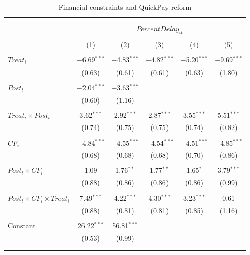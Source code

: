 \documentclass[
]{article}
\begin{document}
\begin{table}[H] \centering 
  \caption{Financial constraints and QuickPay reform} 
  \label{} 
\small 
\begin{tabular}{@{\extracolsep{-2pt}}lccccc} 
\\[-1.8ex]\hline 
\hline \\[-1.8ex] 
\\[-1.8ex] & \multicolumn{5}{c}{$PercentDelay_{it}$  } \\ 
\\[-1.8ex] & (1) & (2) & (3) & (4) & (5)\\ 
\hline \\[-1.8ex] 
 $Treat_i$ & $-$6.69$^{***}$ & $-$4.83$^{***}$ & $-$4.82$^{***}$ & $-$5.20$^{***}$ & $-$9.69$^{***}$ \\ 
  & (0.63) & (0.61) & (0.61) & (0.63) & (1.80) \\ 
  & & & & & \\ 
 $Post_t$ & $-$2.04$^{***}$ & $-$3.63$^{***}$ &  &  &  \\ 
  & (0.60) & (1.16) &  &  &  \\ 
  & & & & & \\ 
 $Treat_i \times Post_t$ & 3.62$^{***}$ & 2.92$^{***}$ & 2.87$^{***}$ & 3.55$^{***}$ & 5.51$^{***}$ \\ 
  & (0.74) & (0.75) & (0.75) & (0.74) & (0.82) \\ 
  & & & & & \\ 
 $CF_i$ & $-$4.84$^{***}$ & $-$4.55$^{***}$ & $-$4.54$^{***}$ & $-$4.51$^{***}$ & $-$4.85$^{***}$ \\ 
  & (0.68) & (0.68) & (0.68) & (0.70) & (0.86) \\ 
  & & & & & \\ 
 $Post_t \times CF_i$ & 1.09 & 1.76$^{**}$ & 1.77$^{**}$ & 1.65$^{*}$ & 3.79$^{***}$ \\ 
  & (0.88) & (0.86) & (0.86) & (0.86) & (0.99) \\ 
  & & & & & \\ 
 $Post_t \times CF_i \times Treat_i$ & 7.49$^{***}$ & 4.22$^{***}$ & 4.30$^{***}$ & 3.23$^{***}$ & 0.61 \\ 
  & (0.88) & (0.81) & (0.81) & (0.85) & (1.16) \\ 
  & & & & & \\ 
 Constant & 26.22$^{***}$ & 56.81$^{***}$ &  &  &  \\ 
  & (0.53) & (0.99) &  &  &  \\ 
  & & & & & \\ 
\hline \\[-1.8ex] 

\end{tabular}
\end{table}
\end{document}
